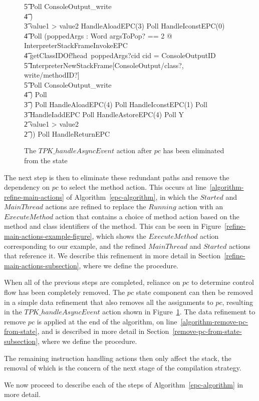 \begin{figure}[t!]
{\begin{circus}
    \t5 Poll \circseq ConsoleOutput\_write \\
    \t4 \circfi) \\
    \t3 {} \circelse value1 > value2 \circthen HandleAloadEPC(3) \circseq Poll \circseq HandleIconstEPC(0) \circseq \\
    \t4 Poll \circseq (\circvar poppedArgs : Word \circspot \lschexpract \exists argsToPop? == 2 @ InterpreterStackFrameInvokeEPC \rschexpract \circseq \\
    \t4 getClassIDOf!head~poppedArgs?cid \then \circif cid = ConsoleOutputID \circthen {} \\
    \t5 \lschexpract InterpreterNewStackFrame[ConsoleOutput/class?, write/methodID?] \rschexpract \circseq \\
    \t5 Poll \circseq ConsoleOutput\_write \\
    \t4 \circfi) \circseq Poll \\
    \t3 \circfi) \circseq Poll \circseq HandleAloadEPC(4) \circseq Poll \circseq HandleIconstEPC(1) \circseq Poll \circseq \\
    \t3 HandleIaddEPC \circseq Poll \circseq HandleAstoreEPC(4) \circseq Poll \circseq Y \\
    \t2 {} \circelse value1 > value2 \circthen \Skip \\
    \t2 \circfi)) \circseq Poll \circseq HandleReturnEPC
  \end{circus}
  }
  \caption{The $TPK\_handleAsyncEvent$ action after $pc$ has been eliminated from the state}
  \label{pc-elimination-HandleAsyncEvent-example-figure}
\end{figure}

The next step is then to eliminate these redundant paths and remove
the dependency on $pc$ to select the method action.
This occurs at line~\ref{algorithm-refine-main-actions} of
Algorithm~\ref{epc-algorithm}, in which the $Started$ and $MainThread$
actions are refined to replace the $Running$ action with an
$ExecuteMethod$ action that contains a choice of method action based
on the method and class identifiers of the method.
This can be seen in Figure~\ref{refine-main-actions-example-figure},
which shows the $ExecuteMethod$ action corresponding to our example,
and the refined $MainThread$ and $Started$ actions that reference it.
We describe this refinement in more detail in
Section~\ref{refine-main-actions-subsection}, where we define the
 procedure.

When all of the previous steps are completed, reliance on $pc$ to
determine control flow has been completely removed.
The $pc$ state component can then be removed in a simple data
refinement that also removes all the assignments to $pc$, resulting in
the $TPK\_handleAsyncEvent$ action shown in
Figure~\ref{pc-elimination-HandleAsyncEvent-example-figure}.
The data refinement to remove $pc$ is applied at the end of the
algorithm, on line~\ref{algorithm-remove-pc-from-state}, and is
described in more detail in
Section~\ref{remove-pc-from-state-subsection}, where we define the
 procedure.

The remaining instruction handling actions then only affect the stack,
the removal of which is the concern of the next stage of the
compilation strategy.

We now proceed to describe each of the steps of
Algorithm~\ref{epc-algorithm} in more detail.
